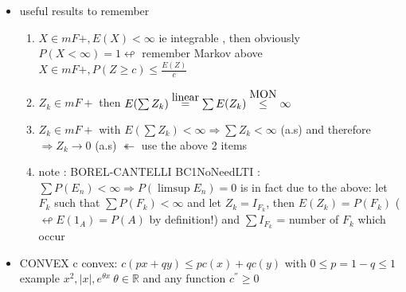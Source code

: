\documentclass[10pt,landscape,a4paper]{article}
\newcommand\myeq[1]{\stackrel{{\normalfont\mbox{#1}}}{ = }}
\newcommand\myle[1]{\stackrel{{\normalfont\mbox{#1}}}{ \le }}
\begin{document}
\begin{multicols*}{3}
\begin{spacing}{0.5}
\begin{itemize}
\item useful results to remember
\begin{enumerate}

\item $X \in mF+, E(X) < \infty$ ie integrable , then obviously $P(X < \infty) =1 \looparrowleft$ remember Markov above $X \in mF+, P(Z \ge c) \le \frac{E(Z)}{c} $

\item $Z_k \in mF+$ then $E(\sum Z_k) \myeq{linear} \sum E(Z_k) \myle{MON} \infty$

\item $Z_k \in mF+$ with $E(\sum Z_k) < \infty \Rightarrow \sum Z_k < \infty$ (a.s) and therefore $\Rightarrow Z_k \rightarrow 0$ (a.s) $\twoheadleftarrow$ use the above 2 items
\item note : \colorbox{green!10}{BOREL-CANTELLI BC1NoNeedLTI : } \colorbox{red!10}{$ \sum P(E_n) < \infty \Rightarrow P(\limsup E_n) = 0 $} is in fact due to the above: let $F_k$ such that $\sum P(F_k) < \infty$ and let $Z_k=I_{F_k}$, then $E(Z_k)=P(F_k)$ ( $ \looparrowleft E(1_A)=P(A)$ by definition!) and $\sum I_{F_k}$ = number of $F_k$ which occur

\end{enumerate}

\item \colorbox{green!10}{CONVEX} c convex: $c(px+qy) \le pc(x) + q c(y)$ with $0 \le p=1-q \le 1$ example $x^2,|x|,e^{\theta x}\ \theta \in \mathbb{R}$ and any function $c^{''} \ge 0$



\end{itemize}
\end{spacing}
\end{multicols*}
\end{document}
